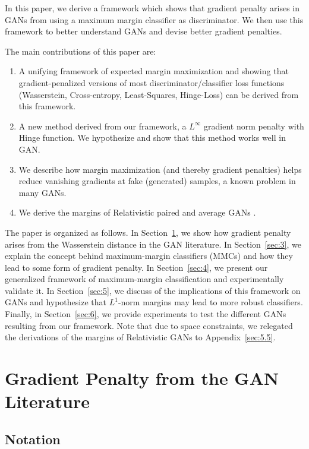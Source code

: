 \documentclass{article}
\begin{document}
    In this paper, we derive a framework which shows that gradient penalty arises in GANs from using a maximum margin classifier as discriminator. We then use this framework to better understand GANs and devise better gradient penalties. 
    
    The main contributions of this paper are:
	\begin{enumerate}
	    \item A unifying framework of expected margin maximization and showing that gradient-penalized versions of most discriminator/classifier loss functions (Wasserstein, Cross-entropy, Least-Squares, Hinge-Loss) can be derived from this framework.
	    \item A new method derived from our framework, a $L^\infty$ gradient norm penalty with Hinge function. We hypothesize and show that this method works well in GAN.
	    \item We describe how margin maximization (and thereby gradient penalties) helps reduce vanishing gradients at fake (generated) samples, a known problem in many GANs.
	    \item We derive the margins of Relativistic paired and average GANs \citep{jolicoeur2018relativistic,jolicoeur2019relativistic}.
	\end{enumerate}
	
	The paper is organized as follows. In Section~\ref{sec:2}, we show how gradient penalty arises from the Wasserstein distance in the GAN literature. In Section~\ref{sec:3}, we explain the concept behind maximum-margin classifiers (MMCs) and how they lead to some form of gradient penalty. In Section~\ref{sec:4}, we present our generalized framework of maximum-margin classification and experimentally validate it. In Section~\ref{sec:5}, we discuss of the implications of this framework on GANs and hypothesize that $L^1$-norm margins may lead to more robust classifiers. Finally, in Section~\ref{sec:6}, we provide experiments to test the different GANs resulting from our framework. Note that due to space constraints, we relegated the derivations of the margins of Relativistic GANs to Appendix~\ref{sec:5.5}.

\section{Gradient Penalty from the GAN Literature}
\label{sec:2}
\subsection{Notation}
\label{sec:notation}
\end{document}
